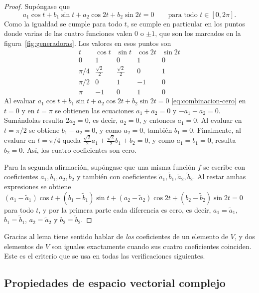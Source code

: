 \begin{proof}
Supóngase que
\begin{equation}\label{eq:combinacion-cero}
  a_1\cos t + b_1\sin t + a_2\cos 2t + b_2\sin 2t = 0
  \qquad\text{para todo } t\in[0,2\pi].
\end{equation}
Como la igualdad se cumple para todo $t$, se cumple en particular en los puntos donde varias
de las cuatro funciones valen $0$ o $\pm 1$, que son los marcados en la
figura~\ref{fig:generadoras}. Los valores en esos puntos son
\[
\begin{array}{c|cccc}
 t & \cos t & \sin t & \cos 2t & \sin 2t\\ \hline
 0 & 1 & 0 & 1 & 0\\
 \pi/4 & \tfrac{\sqrt2}{2} & \tfrac{\sqrt2}{2} & 0 & 1\\
 \pi/2 & 0 & 1 & -1 & 0\\
 \pi & -1 & 0 & 1 & 0
\end{array}
\]
Al evaluar $a_1\cos t+b_1\sin t+a_2\cos 2t+b_2\sin 2t=0$ \eqref{eq:combinacion-cero} en $t=0$ y en $t=\pi$ se obtienen las ecuaciones
$a_1+a_2=0$ y $-a_1+a_2=0$. Sumándolas resulta $2a_2=0$, es decir, $a_2=0$, y entonces
$a_1=0$. Al evaluar en $t=\pi/2$ se obtiene $b_1-a_2=0$, y como $a_2=0$, también $b_1=0$.
Finalmente, al evaluar en $t=\pi/4$ queda
$\tfrac{\sqrt2}{2}a_1+\tfrac{\sqrt2}{2}b_1+b_2=0$, y como $a_1=b_1=0$, resulta $b_2=0$. Así,
los cuatro coeficientes son cero.

Para la segunda afirmación, supóngase que una misma función $f$ se escribe con coeficientes
$a_1,b_1,a_2,b_2$ y también con coeficientes $\tilde a_1,\tilde b_1,\tilde a_2,\tilde b_2$. Al
restar ambas expresiones se obtiene
$(a_1-\tilde a_1)\cos t+(b_1-\tilde b_1)\sin t+(a_2-\tilde a_2)\cos 2t+(b_2-\tilde b_2)\sin 2t=0$
para todo $t$, y por la primera parte cada diferencia es cero, es decir, $a_1=\tilde a_1$,
$b_1=\tilde b_1$, $a_2=\tilde a_2$ y $b_2=\tilde b_2$.
\end{proof}

Gracias al lema tiene sentido hablar de \emph{los} coeficientes de un elemento de $V$, y dos
elementos de $V$ son iguales exactamente cuando sus cuatro coeficientes coinciden. Este es el
criterio que se usa en todas las verificaciones siguientes.

\subsection*{Propiedades de espacio vectorial complejo}

